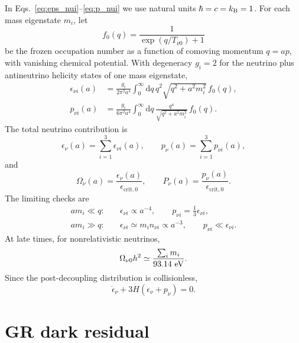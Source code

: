 \documentclass[
  aps,
  prd,
  reprint,
  superscriptaddress,
  nofootinbib,
  floatfix,
  longbibliography
]{revtex4-2}
\theoremstyle{plain}
\theoremstyle{definition}
\theoremstyle{remark}
\newcommand{\dd}{\mathrm d}
\newcommand{\crit}{\epsilon_{\mathrm{crit},0}}
\begin{document}
In Eqs.~\eqref{eq:eps_nui}--\eqref{eq:p_nui} we use natural units
$\hbar=c=k_{\rm B}=1$.  For each mass eigenstate $m_i$, let
\begin{equation}
f_0(q)=\frac{1}{\exp(q/T_{\nu0})+1}
\label{eq:f0_nu}
\end{equation}
be the frozen occupation number as a function of comoving momentum $q=ap$,
with vanishing chemical potential.  With degeneracy $g_i=2$ for the neutrino
plus antineutrino helicity states of one mass eigenstate,
\begin{align}
\epsilon_{\nu i}(a)&=
\frac{g_i}{2\pi^2a^4}
\int_0^\infty \dd q\,q^2
\sqrt{q^2+a^2m_i^2}\, f_0(q),
\label{eq:eps_nui}\\
p_{\nu i}(a)&=
\frac{g_i}{6\pi^2a^4}
\int_0^\infty \dd q\,
\frac{q^4}{\sqrt{q^2+a^2m_i^2}}\, f_0(q).
\label{eq:p_nui}
\end{align}
The total neutrino contribution is
\begin{equation}
\epsilon_\nu(a)=\sum_{i=1}^{3}\epsilon_{\nu i}(a),\qquad
p_\nu(a)=\sum_{i=1}^{3}p_{\nu i}(a),
\end{equation}
and
\begin{equation}
\Omega_\nu(a)=\frac{\epsilon_\nu(a)}{\crit},\qquad
P_\nu(a)=\frac{p_\nu(a)}{\crit}.
\label{eq:Onu_Pnu}
\end{equation}
The limiting checks are
\begin{align}
a m_i\ll q:\quad&
\epsilon_{\nu i}\propto a^{-4},\qquad
p_{\nu i}=\frac13\epsilon_{\nu i},
\label{eq:nu_rel_limit}\\
a m_i\gg q:\quad&
\epsilon_{\nu i}\simeq m_i n_{\nu i}\propto a^{-3},\qquad
p_{\nu i}\ll\epsilon_{\nu i}.
\label{eq:nu_nonrel_limit}
\end{align}
At late times, for nonrelativistic neutrinos,
\begin{equation}
\Omega_{\nu0}h^2\simeq
\frac{\sum_i m_i}{93.14\ {\rm eV}} .
\label{eq:Onu_mass_sum}
\end{equation}
Since the post-decoupling distribution is collisionless,
\begin{equation}
\dot\epsilon_\nu+3H(\epsilon_\nu+p_\nu)=0.
\label{eq:nu_conservation}
\end{equation}

\section{GR dark residual}
\end{document}
